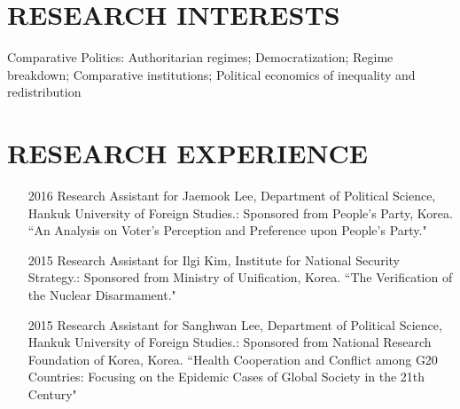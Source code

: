 \documentclass[11pt]{res} %
\begin{document}
\begin{resume}
\section{RESEARCH INTERESTS}
Comparative Politics: Authoritarian regimes; Democratization; Regime breakdown; Comparative institutions; Political economics of inequality and redistribution

\section{RESEARCH EXPERIENCE} 
 \begin{itemize}
 	\item[2016] Research Assistant for Jaemook Lee, Department of Political Science, Hankuk University of Foreign Studies.: Sponsored from People's Party, Korea. ``An Analysis on Voter’s Perception and Preference upon People’s Party."
 	\item[2015] Research Assistant for Ilgi Kim, Institute for National Security Strategy.: Sponsored from Ministry of Unification, Korea. ``The Verification of the Nuclear Disarmament."
 	\item[2015] Research Assistant for Sanghwan Lee, Department of Political Science, Hankuk University of Foreign Studies.: Sponsored from National Research Foundation of Korea, Korea. ``Health Cooperation and Conflict among G20 Countries: Focusing on the Epidemic Cases of Global Society in the 21th Century"
 \end{itemize}
 

\end{resume}
\end{document}
